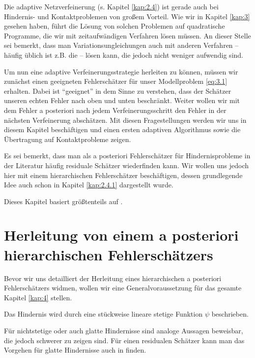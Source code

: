 \label{kap:4}


Die adaptive Netzverfeinerung (s. Kapitel \ref{kap:2.4}) ist gerade auch bei Hindernis- und Kontaktproblemen von großem Vorteil. Wie wir in Kapitel \ref{kap:3} gesehen haben, führt die Lösung von solchen Problemen auf quadratische Programme, die wir mit zeitaufwändigen Verfahren lösen müssen. An dieser Stelle sei bemerkt, dass man Variationsungleichungen auch mit anderen Verfahren – häufig üblich ist z.B. die \textit{} – lösen kann, die jedoch nicht weniger aufwendig sind.


Um nun eine adaptive Verfeinerungsstrategie herleiten zu können, müssen wir zunächst einen geeigneten Fehlerschätzer für unser Modellproblem \eqref{eq:3.1} erhalten. Dabei ist "`geeignet"' in dem Sinne zu verstehen, dass der Schätzer unseren echten Fehler nach oben und unten beschränkt. Weiter wollen wir mit dem Fehler a posteriori nach jedem Verfeinerungsschritt den Fehler in der nächsten Verfeinerung abschätzen. Mit diesen Fragestellungen werden wir uns in diesem Kapitel beschäftigen und einen ersten adaptiven Algorithmus sowie die Übertragung auf Kontaktprobleme zeigen.


Es sei bemerkt, dass man als a posteriori Fehlerschätzer für Hindernisprobleme in der Literatur häufig residuale Schätzer wiederfinden kann. Wir wollen uns jedoch hier mit einem hierarchischen Fehlerschätzer beschäftigen, dessen grundlegende Idee auch schon in Kapitel \ref{kap:2.4.1} dargestellt wurde.

Dieses Kapitel basiert größtenteils auf \cite{ZouVee}.




\section{Herleitung von einem a posteriori hierarchischen Fehlerschätzers}
\label{kap:4.1}

Bevor wir uns detailliert der Herleitung eines hierarchischen a posteriori Fehlerschätzers widmen, wollen wir eine Generalvoraussetzung für das gesamte Kapitel \ref{kap:4} stellen.


\begin{vor}\label{vor:4.1}
Das Hindernis  wird durch eine stückweise lineare stetige Funktion $\psi$ beschrieben.
\end{vor}


Für nichtstetige oder auch glatte Hindernisse sind analoge Aussagen beweisbar, die jedoch schwerer zu zeigen sind. Für einen residualen Schätzer kann man das Vorgehen für glatte Hindernisse auch in \cite{Page} finden.







